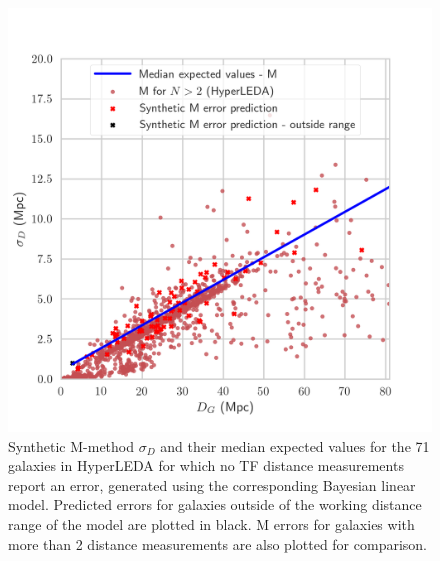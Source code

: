 \documentclass[a4paper,fleqn,usenatbib]{mnras}
\begin{document}
\begin{figure}
	\includegraphics[scale=0.7]{predhl2.png}
    \caption{Synthetic M-method $\sigma_D$ and their median expected values for the 71 galaxies in HyperLEDA for which no TF distance measurements report an error, generated using the corresponding Bayesian linear model. Predicted errors for galaxies outside of the working distance range of the model are plotted in black. M errors for galaxies with more than 2 distance measurements are also plotted for comparison.}
    \label{fig:predhl2}
\end{figure}
\end{document}
